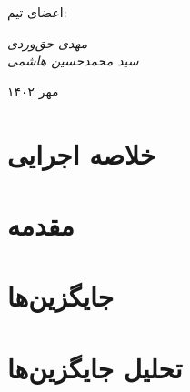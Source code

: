 \documentclass[11pt]{article}
\begin{document}
    \begin{titlepage}
        \centering
        \vspace{1cm}
        {\Huge {}\par}
        \vspace{2mm}
        {\large {}}
        
        \vfill \par	\vfill
        
        {\small
        اعضای تیم: \par    
            \itshape                مهدی حق‌وردی\\
            سید محمدحسین هاشمی \par}
        \vspace{5cm}
        {\large مهر ۱۴۰۲\par}
    \end{titlepage}
\tableofcontents
\newpage

\section{خلاصه اجرایی}

\section{مقدمه}

\section{جایگزین‌ها}

\section{تحلیل جایگزین‌ها}
\end{document}
